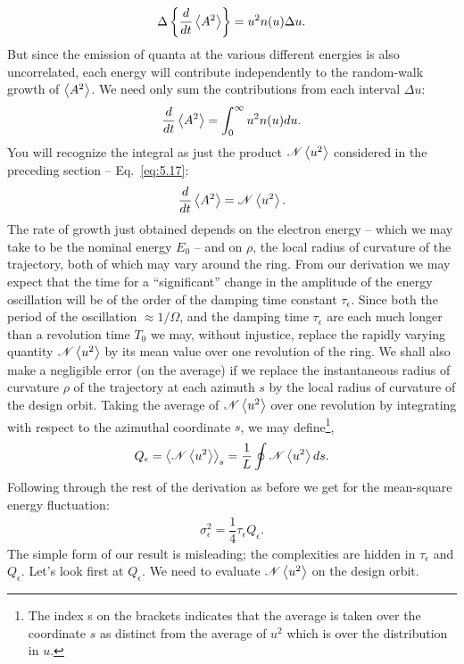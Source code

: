 \begin{align}
	\Delta \left\lbrace \dfrac{d}{dt}\left< A^2 \right> \right\rbrace = u^2 n(u) \Delta u.
\end{align}
But since the emission of quanta at the various different energies is also uncorrelated, each energy will contribute independently to the random-walk growth of $\left< A^2 \right>$. We need only sum the contributions from each interval $\Delta u$:
\begin{align}
	\dfrac{d}{dt}\left< A^2 \right> = \int_0^\infty u^2 n(u) du.
\end{align}
You will recognize the integral as just the product $\mathscr{N}\left< u^2 \right>$ considered in the preceding section -- Eq.~\eqref{eq:5.17}:
\begin{align}
	\dfrac{d}{dt} \left< A^2 \right> = \mathscr{N} \left< u^2 \right>.
\end{align}
The rate of growth just obtained depends on the electron energy -- which we may take to be the nominal energy $E_0$ -- and on $\rho$, the local radius of curvature of the trajectory, both of which may vary around the ring. From our derivation we may expect that the time for a ``significant'' change in the amplitude of the energy oscillation will be of the order of the damping time constant $\tau_\epsilon$. Since both the period of the oscillation $\approx 1/\Omega$,
 and the damping time $\tau_\epsilon$ are each much longer than a revolution time $T_0$ we may, without injustice, replace the rapidly varying quantity $\mathscr{N}\left< u^2 \right>$ by its mean value over one revolution of the ring. We shall also make a negligible error (on the average) if we replace the instantaneous radius of curvature $\rho$ of the trajectory at each azimuth $s$ by the local radius of curvature of the design orbit. Taking the average of $\mathscr{N}\left< u^2 \right>$
 over one revolution by integrating with respect to the azimuthal coordinate $s$, we may define\footnote{The index s on the brackets indicates that the average is taken over the coordinate $s$ as distinct from the average of $u^2$ which is over the distribution in $u$.},
\begin{align}
	Q_\epsilon = \left< \mathscr{N}\left< u^2 \right> \right>_s = \dfrac{1}{L} \oint \mathscr{N} \left< u^2 \right> ds.
\end{align}
Following through the rest of the derivation as before we get for the mean-square energy fluctuation:
\begin{align} \label{eq:5.37}
	\sigma_\epsilon^2 = \dfrac{1}{4} \tau_\epsilon Q_\epsilon.
\end{align}
The simple form of our result is misleading; the complexities are hidden in $\tau_\epsilon$ and $Q_\epsilon$. Let's look first at $Q_\epsilon$. We need to evaluate $\mathscr{N} \left< u^2 \right>$ on the design orbit.\\

